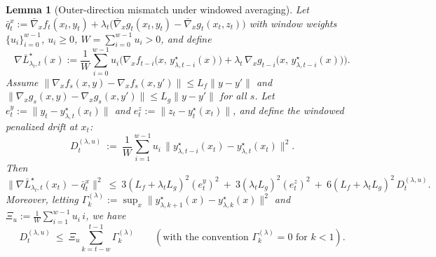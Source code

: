 \documentclass{uai2026} %
\newtheorem{lemma}{Lemma}[section]
\begin{document}
\begin{lemma}[Outer-direction mismatch under windowed averaging]
\label{lem:mismatch-window}
Let $\bar q^x_t:=\bar\nabla_x f_t(x_t,y_t)+\lambda_t\big(\bar\nabla_x g_t(x_t,y_t)-\bar\nabla_x g_t(x_t,z_t)\big)$
with window weights $\{u_i\}_{i=0}^{w-1}$, $u_i\ge0$, $W=\sum_{i=0}^{w-1}u_i>0$, and define
\[
\nabla\bar L^{\star}_{\lambda_t,t}(x):=\frac{1}{W}\sum_{i=0}^{w-1}u_i\Big(\nabla_x f_{t-i}\big(x,\,y^{\star}_{\lambda,t-i}(x)\big)
+\lambda_t\,\nabla_x g_{t-i}\big(x,\,y^{\star}_{\lambda,t-i}(x)\big)\Big).
\]
Assume $\|\nabla_x f_s(x,y)-\nabla_x f_s(x,y')\|\le L_f\|y-y'\|$ and
$\|\nabla_x g_s(x,y)-\nabla_x g_s(x,y')\|\le L_g\|y-y'\|$ for all $s$.
Let $e^y_t:=\|y_t-y^{\star}_{\lambda,t}(x_t)\|$ and $e^z_t:=\|z_t-y^{\star}_{t}(x_t)\|$, and define the
windowed penalized drift at $x_t$:
\[
D^{(\lambda,u)}_t\ :=\ \frac{1}{W}\sum_{i=1}^{w-1}u_i\,
\big\|y^{\star}_{\lambda,t-i}(x_t)-y^{\star}_{\lambda,t}(x_t)\big\|^2.
\]
Then
\begin{equation}\label{eq:mismatch-window}
\bigl\|\nabla\bar L^{\star}_{\lambda_t,t}(x_t)-\bar q^x_t\bigr\|^2
\ \le\ 
3(L_f+\lambda_t L_g)^2(e^y_t)^2
\ +\ 3(\lambda_t L_g)^2(e^z_t)^2
\ +\ 6(L_f+\lambda_t L_g)^2\,D^{(\lambda,u)}_t.
\end{equation}
Moreover, letting $\Gamma^{(\lambda)}_k:=\sup_x\|y^{\star}_{\lambda,k+1}(x)-y^{\star}_{\lambda,k}(x)\|^2$ and
$\Xi_u:=\frac{1}{W}\sum_{i=1}^{w-1}u_i\,i$, we have
\begin{equation}\label{eq:D-lambdau-to-Gamma}
D^{(\lambda,u)}_t\ \le\ \Xi_u\sum_{k=t-w}^{t-1}\Gamma^{(\lambda)}_k
\qquad(\text{with the convention }\Gamma^{(\lambda)}_k=0\text{ for }k<1).
\end{equation}
\end{lemma}
\end{document}
